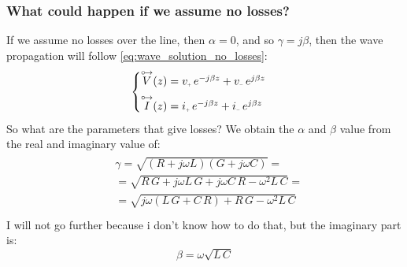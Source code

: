 \subsubsection*{What could happen if we assume no losses?}
If we assume no losses over the line, then $\alpha=0$, and so $\gamma = j\beta$, then the wave propagation will follow \cref{eq:wave_solution_no_losses}:
\begin{equation}
  \begin{cases}
  \phas{V}(z)=v_{\scaleto{+}{3pt}}\,e^{-j\beta z}+v_{\scaleto{-}{3pt}}\,e^{j\beta z}\\[5pt]
  \phas{I}(z)=i_{\scaleto{+}{3pt}}\,e^{-j\beta z}+i_{\scaleto{-}{3pt}}\,e^{j\beta z}
  \end{cases}\label{eq:wave_solution_no_losses}
\end{equation}
So what are the parameters that give losses? We obtain the $\alpha$ and $\beta$ value from the real and imaginary value of:
\begin{align}
  \begin{split}
    &\gamma =\sqrt{(R+j\omega L)(G+j\omega C)}=\\[5pt]
    &=\sqrt{R\,G+j\omega L\,G+j\omega C\,R-\omega^2L\,C}=\\[5pt]
    &=\sqrt{j\omega( L\,G + C\,R)+R\,G-\omega^2L\,C}\\[5pt]
  \end{split}
\end{align}
I will not go further because i don't know how to do that, but the imaginary part is:
\begin{equation}
  \beta=\omega\sqrt{L\,C}
\end{equation}